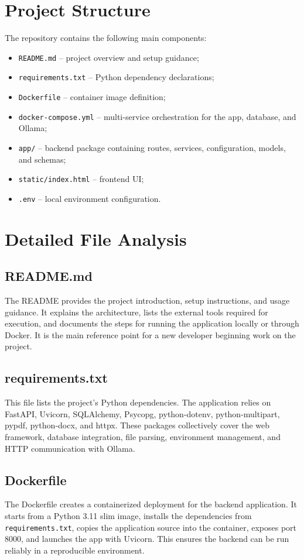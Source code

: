 ﻿\documentclass[11pt,a4paper]{article}
\begin{document}
\section{Project Structure}
The repository contains the following main components:
\begin{itemize}[leftmargin=*]
    \item \texttt{README.md} -- project overview and setup guidance;
    \item \texttt{requirements.txt} -- Python dependency declarations;
    \item \texttt{Dockerfile} -- container image definition;
    \item \texttt{docker-compose.yml} -- multi-service orchestration for the app, database, and Ollama;
    \item \texttt{app/} -- backend package containing routes, services, configuration, models, and schemas;
    \item \texttt{static/index.html} -- frontend UI;
    \item \texttt{.env} -- local environment configuration.
\end{itemize}

\section{Detailed File Analysis}

\subsection{README.md}
The README provides the project introduction, setup instructions, and usage guidance. It explains the architecture, lists the external tools required for execution, and documents the steps for running the application locally or through Docker. It is the main reference point for a new developer beginning work on the project.

\subsection{requirements.txt}
This file lists the project's Python dependencies. The application relies on FastAPI, Uvicorn, SQLAlchemy, Psycopg, python-dotenv, python-multipart, pypdf, python-docx, and httpx. These packages collectively cover the web framework, database integration, file parsing, environment management, and HTTP communication with Ollama.

\subsection{Dockerfile}
The Dockerfile creates a containerized deployment for the backend application. It starts from a Python 3.11 slim image, installs the dependencies from \texttt{requirements.txt}, copies the application source into the container, exposes port 8000, and launches the app with Uvicorn. This ensures the backend can be run reliably in a reproducible environment.
\end{document}
